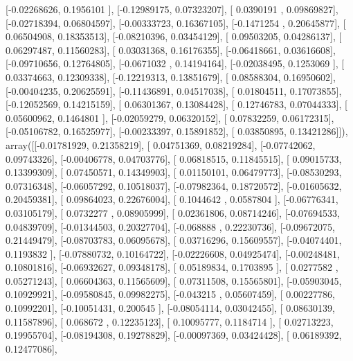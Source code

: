 \documentclass{article}
\begin{document}
       [-0.02268626,  0.1956101 ],
       [-0.12989175,  0.07323207],
       [ 0.0390191 ,  0.09869827],
       [-0.02718394,  0.06804597],
       [-0.00333723,  0.16367105],
       [-0.1471254 ,  0.20645877],
       [ 0.06504908,  0.18353513],
       [-0.08210396,  0.03454129],
       [ 0.09503205,  0.04286137],
       [ 0.06297487,  0.11560283],
       [ 0.03031368,  0.16176355],
       [-0.06418661,  0.03616608],
       [-0.09710656,  0.12764805],
       [-0.0671032 ,  0.14194164],
       [-0.02038495,  0.1253069 ],
       [ 0.03374663,  0.12309338],
       [-0.12219313,  0.13851679],
       [ 0.08588304,  0.16950602],
       [-0.00404235,  0.20625591],
       [-0.11436891,  0.04517038],
       [ 0.01804511,  0.17073855],
       [-0.12052569,  0.14215159],
       [ 0.06301367,  0.13084428],
       [ 0.12746783,  0.07044333],
       [ 0.05600962,  0.1464801 ],
       [-0.02059279,  0.06320152],
       [ 0.07832259,  0.06172315],
       [-0.05106782,  0.16525977],
       [-0.00233397,  0.15891852],
       [ 0.03850895,  0.13421286]]), array([[-0.01781929,  0.21358219],
       [ 0.04751369,  0.08219284],
       [-0.07742062,  0.09743326],
       [-0.00406778,  0.04703776],
       [ 0.06818515,  0.11845515],
       [ 0.09015733,  0.13399309],
       [ 0.07450571,  0.14349903],
       [ 0.01150101,  0.06479773],
       [-0.08530293,  0.07316348],
       [-0.06057292,  0.10518037],
       [-0.07982364,  0.18720572],
       [-0.01605632,  0.20459381],
       [ 0.09864023,  0.22676004],
       [ 0.1044642 ,  0.0587804 ],
       [-0.06776341,  0.03105179],
       [ 0.0732277 ,  0.08905999],
       [ 0.02361806,  0.08714246],
       [-0.07694533,  0.04839709],
       [-0.01344503,  0.20327704],
       [-0.068888  ,  0.22230736],
       [-0.09672075,  0.21449479],
       [-0.08703783,  0.06095678],
       [ 0.03716296,  0.15609557],
       [-0.04074401,  0.1193832 ],
       [-0.07880732,  0.10164722],
       [-0.02226608,  0.04925474],
       [-0.00248481,  0.10801816],
       [-0.06932627,  0.09348178],
       [ 0.05189834,  0.1703895 ],
       [ 0.0277582 ,  0.05271243],
       [ 0.06604363,  0.11565609],
       [ 0.07311508,  0.15565801],
       [-0.05903045,  0.10929921],
       [-0.09580845,  0.09982275],
       [-0.043215  ,  0.05607459],
       [ 0.00227786,  0.10992201],
       [-0.10051431,  0.200545  ],
       [-0.08054114,  0.03042455],
       [ 0.08630139,  0.11587896],
       [ 0.068672  ,  0.12235123],
       [ 0.10095777,  0.1184714 ],
       [ 0.02713223,  0.19955704],
       [-0.08194308,  0.19278829],
       [-0.00097369,  0.03424428],
       [ 0.06189392,  0.12477086],
\end{document}
